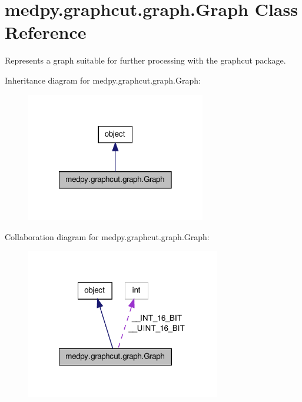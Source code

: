\hypertarget{classmedpy_1_1graphcut_1_1graph_1_1Graph}{
\section{medpy.graphcut.graph.Graph Class Reference}
\label{classmedpy_1_1graphcut_1_1graph_1_1Graph}
}


Represents a graph suitable for further processing with the graphcut package.  




Inheritance diagram for medpy.graphcut.graph.Graph:\nopagebreak
\begin{figure}[H]
\begin{center}
\leavevmode
\includegraphics[width=222pt]{classmedpy_1_1graphcut_1_1graph_1_1Graph__inherit__graph}
\end{center}
\end{figure}


Collaboration diagram for medpy.graphcut.graph.Graph:\nopagebreak
\begin{figure}[H]
\begin{center}
\leavevmode
\includegraphics[width=240pt]{classmedpy_1_1graphcut_1_1graph_1_1Graph__coll__graph}
\end{center}
\end{figure}

